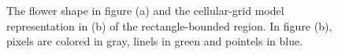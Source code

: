 \documentclass[smallextended]{svjour3}       %
\begin{document}
\begin{figure}[h!]
	\center
	\hspace{40pt}%
	\caption{The flower shape in figure (a) and the cellular-grid model representation in (b) of the rectangle-bounded region. In figure (b), pixels are colored in gray, linels in green and pointels in blue.}
	\label{fig:cellular-grid-model}
\end{figure}
\end{document}

